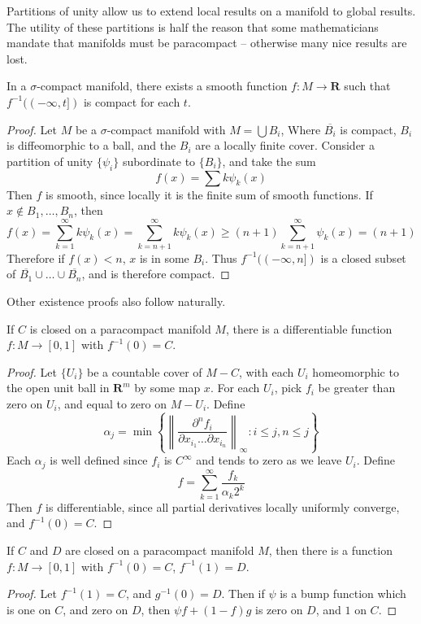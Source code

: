 Partitions of unity allow us to extend local results on a manifold to global results. The utility of these partitions is half the reason that some mathematicians mandate that manifolds must be paracompact -- otherwise many nice results are lost.

\begin{theorem}
    In a $\sigma$-compact manifold, there exists a smooth function $f:M \to \mathbf{R}$ such that $f^{-1}((-\infty, t])$ is compact for each $t$.
\end{theorem}
\begin{proof}
    Let $M$ be a $\sigma$-compact manifold with $M = \bigcup B_i$, Where $\overline{B_i}$ is compact, $B_i$ is diffeomorphic to a ball, and the $B_i$ are a locally finite cover. Consider a partition of unity $\{\psi_i\}$ subordinate to $\{B_i\}$, and take the sum
    \[ f(x) = \sum k \psi_k(x) \]
    Then $f$ is smooth, since locally it is the finite sum of smooth functions. If $x \not \in B_1, \dots, B_n$, then
    \[ f(x) = \sum_{k = 1}^\infty k \psi_k(x) = \sum_{k = n+1}^\infty k \psi_k(x) \geq (n+1) \sum_{k = n+1}^\infty \psi_k(x) = (n+1) \]
    Therefore if $f(x) < n$, $x$ is in some $B_i$. Thus $f^{-1}((-\infty, n])$ is a closed subset of $\overline{B_1} \cup \dots \cup \overline{B_n}$, and is therefore compact.
\end{proof}

Other existence proofs also follow naturally.

\begin{lemma}
    If $C$ is closed on a paracompact manifold $M$, there is a differentiable function $f: M \to [0,1]$ with $f^{-1}(0) = C$.
\end{lemma}
\begin{proof}
    Let $\{ U_i \}$ be a countable cover of $M - C$, with each $U_i$ homeomorphic to the open unit ball in $\mathbf{R}^m$ by some map $x$. For each $U_i$, pick $f_i$ be greater than zero on $U_i$, and equal to zero on $M - U_i$. Define
    \[ \alpha_j = \min \left\{ \left\| \frac{\partial^n f_i}{\partial x_{i_1} \dots \partial x_{i_n}} \right\|_\infty : i \leq j, n \leq j \right\} \]
    Each $\alpha_j$ is well defined since $f_i$ is $C^\infty$ and tends to zero as we leave $U_i$. Define
    \[ f = \sum_{k = 1}^\infty \frac{f_k}{\alpha_k 2^k} \]
    Then $f$ is differentiable, since all partial derivatives locally uniformly converge, and $f^{-1}(0) = C$.
\end{proof}

\begin{corollary}
    If $C$ and $D$ are closed on a paracompact manifold $M$, then there is a function $f: M \to [0,1]$ with $f^{-1}(0) = C$, $f^{-1}(1) = D$.
\end{corollary}
\begin{proof}
    Let $f^{-1}(1) = C$, and $g^{-1}(0) = D$. Then if $\psi$ is a bump function which is one on $C$, and zero on $D$, then $\psi f + (1 - f)g$ is zero on $D$, and $1$ on $C$.
\end{proof}





